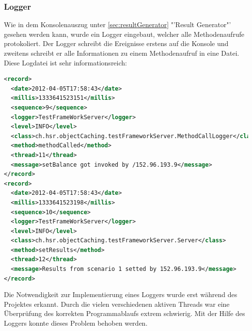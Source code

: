 \subsubsection{Logger}
\label{sec:logger}
Wie in dem Konsolenauszug unter \ref{sec:resultGenerator} "'Result Generator"' gesehen werden kann, wurde ein Logger eingebaut, welcher alle Methodenaufrufe protokoliert. Der Logger schreibt die Ereignisse erstens auf die Konsole und zweitens schreibt er alle Informationen zu einem Methodenaufruf in eine Datei. Diese Logdatei ist sehr informationsreich:

\begin{lstlisting}[language=XML, breaklines=true]
<record>
  <date>2012-04-05T17:58:43</date>
  <millis>1333641523151</millis>
  <sequence>9</sequence>
  <logger>TestFrameWorkServer</logger>
  <level>INFO</level>
  <class>ch.hsr.objectCaching.testFrameworkServer.MethodCallLogger</class>
  <method>methodCalled</method>
  <thread>11</thread>
  <message>setBalance got invoked by /152.96.193.9</message>
</record>
<record>
  <date>2012-04-05T17:58:43</date>
  <millis>1333641523198</millis>
  <sequence>10</sequence>
  <logger>TestFrameWorkServer</logger>
  <level>INFO</level>
  <class>ch.hsr.objectCaching.testFrameworkServer.Server</class>
  <method>setResults</method>
  <thread>12</thread>
  <message>Results from scenario 1 setted by 152.96.193.9</message>
</record>
\end{lstlisting}

Die Notwendigkeit zur Im\-pl\-emen\-tie\-rung eines Log\-gers wurde erst wäh\-rend des Projektes erkannt. Durch die vielen verschiedenen aktiven Threads war eine Überprüfung des korrekten Programmablaufs extrem schwierig. Mit der Hilfe des Loggers konnte dieses Problem behoben werden.

